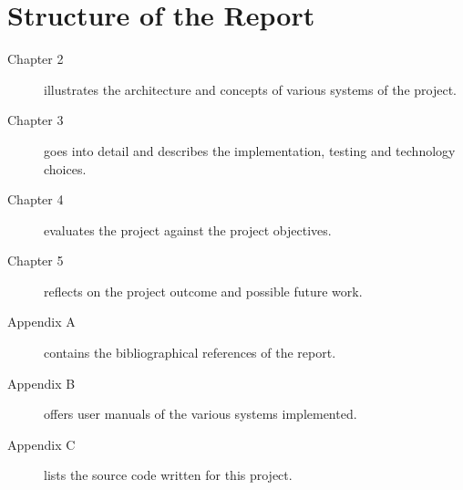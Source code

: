 \section{Structure of the Report}

\begin{description}
    \item[Chapter 2] illustrates the architecture and concepts of various systems of the project.
    \item[Chapter 3] goes into detail and describes the implementation, testing and technology choices.
    \item[Chapter 4] evaluates the project against the project objectives.
    \item[Chapter 5] reflects on the project outcome and possible future work.
    \item[Appendix A] contains the bibliographical references of the report.
    \item[Appendix B] offers user manuals of the various systems implemented.
    \item[Appendix C] lists the source code written for this project.
\end{description}